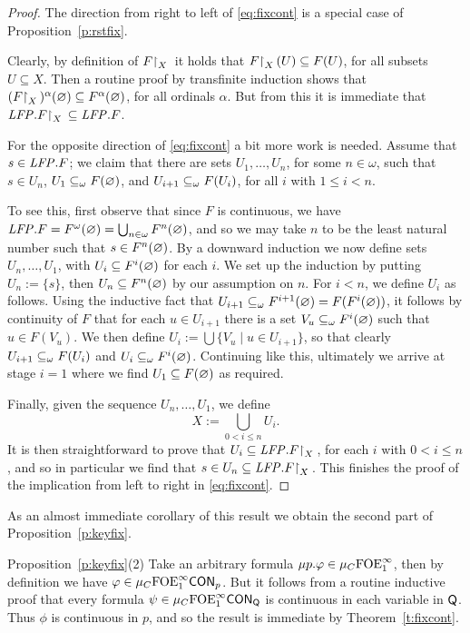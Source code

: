 \begin{proof}
The direction from right to left of \eqref{eq:fixcont} is a special case of 
Proposition~\ref{p:rstfix}.

Clearly, by definition of $F{\upharpoonright}_{X}\,$ it holds that $F{\upharpoonright}_{X}\,(U) \subseteq F(U)$, 
for all subsets $U \subseteq X$.
Then a routine proof by transfinite induction shows that 
$(F{\upharpoonright}_{X}\,)^{\alpha}(\varnothing) \subseteq F^{\alpha}(\varnothing)$, for all ordinals 
$\alpha$.
But from this it is immediate that $\mathit{LFP}.F{\upharpoonright}_{X}\, \subseteq \mathit{LFP}. F$.

For the opposite direction of \eqref{eq:fixcont} a bit more work is needed.
Assume that $s \in \mathit{LFP}. F$; we claim that there are sets $U_{1},\ldots,U_{n}$,
for some $n \in \omega$, such that $s \in U_{n}$, $U_{1} \subseteq_{\omega} F(\varnothing)$,
and $U_{i+1} \subseteq_{\omega} F(U_{i})$, for all $i$ with $1 \leq i < n$.

To see this, first observe that since $F$ is continuous, we have $\mathit{LFP}. F = 
F^{\omega}(\varnothing) = \bigcup_{n\in\omega}F^{n}(\varnothing)$, and so we may take $n$ to
be the least natural number such that $s \in F^{n}(\varnothing)$.
By a downward induction we now define sets $U_{n},\ldots,U_{1}$, with $U_{i} 
\subseteq F^{i}(\varnothing)$ for each $i$. 
We set up the induction by putting $U_{n} \mathrel{:=} \{ s \}$, then $U_{n}
\subseteq F^{n}(\varnothing)$ by our assumption on $n$.
For $i<n$, we define $U_{i}$ as follows.
Using the inductive fact that $U_{i+1} \subseteq_{\omega} F^{i+1}(\varnothing) = 
F(F^{i}(\varnothing))$, it follows by continuity of $F$ that for each $u \in U_{i+1}$
there is a set $V_{u} \subseteq_{\omega} F^{i}(\varnothing)$ such that $u \in F(V_{u})$.
We then define $U_{i} \mathrel{:=} \bigcup \{ V_{u} \mid u \in U_{i+1} \}$,
so that clearly $U_{i+1} \subseteq_{\omega} F(U_{i})$ and $U_{i} \subseteq_{\omega}
F^{i}(\varnothing)$.
Continuing like this, ultimately we arrive at stage $i=1$ where we find
$U_{1} \subseteq F(\varnothing)$ as required.

Finally, given the sequence $U_{n},\ldots,U_{1}$, we define 
\[
X \mathrel{:=} \bigcup_{0<i\leq n} U_{i}.
\]
It is then straightforward to prove that $U_{i} \subseteq \mathit{LFP}. F{\upharpoonright}_{X}\,$, for each 
$i$ with $0<i\leq n$, and so in particular we find that $s \in U_{n} \subseteq \mathit{LFP}.
F{\upharpoonright}_{X}\,$.
This finishes the proof of the implication from left to right in 
\eqref{eq:fixcont}.
\end{proof}

\noindent
As an almost immediate corollary of this result we obtain the second part of 
Proposition~\ref{p:keyfix}.

\begin{proofof}{Proposition~\ref{p:keyfix}(2)}
Take an arbitrary formula $\mu p. \varphi \in \mu_{C}\mathrm{FOE}^{\infty}_1$, then by definition 
we have $\varphi \in \mu_{C}\mathrm{FOE}^{\infty}_1\mathsf{CON}_{p}$.
But it follows from a routine inductive proof that every formula $\psi \in 
\mu_{C}\mathrm{FOE}^{\infty}_1\mathsf{CON}_{\mathsf{Q}}$ is continuous in each variable in $\mathsf{Q}$.
Thus $\phi$ is continuous in $p$, and so the result is immediate by 
Theorem~\ref{t:fixcont}.
\end{proofof}

